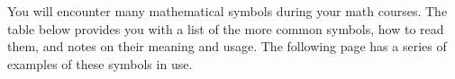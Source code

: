 %
%
%
%
%
%
%




You will encounter many mathematical symbols during your math courses.
The table below provides you with a list  of the more common
symbols, how to read them, and notes on their meaning and usage.
The following page has a series of examples of these symbols in use.

\vfill

